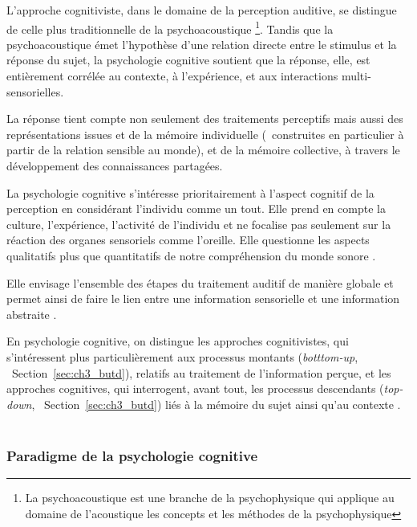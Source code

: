 {L'approche cognitiviste, dans le domaine de la perception auditive, se distingue de celle plus traditionnelle de la psychoacoustique \footnote{La psychoacoustique est une branche de la psychophysique qui applique au domaine de l'acoustique les concepts et les méthodes de la psychophysique}. Tandis que la psychoacoustique émet l'hypothèse d'une relation directe entre le stimulus et la réponse du sujet, la psychologie cognitive soutient que la réponse, elle, est entièrement corrélée au contexte, à l'expérience, et aux interactions multi-sensorielles.

La réponse tient compte non seulement des traitements perceptifs mais aussi des représentations issues et de la mémoire individuelle (\ie~construites en particulier à partir de la relation sensible au monde), et de la mémoire collective, à travers le développement des connaissances partagées.

La psychologie cognitive s'intéresse prioritairement à l'aspect cognitif de la perception en considérant l'individu comme un tout. Elle prend en compte la culture, l'expérience, l'activité de l'individu et ne focalise pas seulement sur la réaction des organes sensoriels comme l'oreille. Elle questionne les aspects qualitatifs plus que quantitatifs de notre compréhension du monde sonore \citep{maffiolo_marieParis_1997,maffiolo_caracterisation_1999}.

Elle envisage l'ensemble des étapes du traitement auditif de manière globale et permet ainsi de faire le lien entre une information sensorielle et une information abstraite \citep{mcadams1994penser}.

En psychologie cognitive, on distingue les approches cognitivistes, qui s'intéressent plus particulièrement aux processus montants (\emph{botttom-up}, \cf~Section~\ref{sec:ch3_butd}), relatifs au traitement de l'information perçue, et les approches cognitives, qui interrogent, avant tout, les processus descendants (\emph{top-down}, \cf~Section~\ref{sec:ch3_butd}) liés à la mémoire du sujet ainsi qu'au contexte \citep[p. 34]{guastavino_etude_2003}. \\

 \\

\subsubsection{Paradigme de la psychologie cognitive}
\label{sec:ch3_psychoCog}

}

